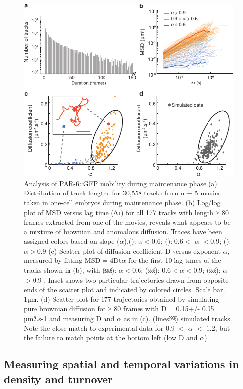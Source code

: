   \begin{figure}[h!]
  	\centering
  	\includegraphics[width=0.8\hsize]{nmeth/Fig3}
  	\caption{\label{fig:fig3}Analysis of PAR-6::GFP mobility during maintenance phase (a) Distribution of track lengths for 30,558 tracks from n = 5 movies taken in one-cell embryos during maintenance phase. (b) Log/log plot of MSD versus lag time (∆τ) for all 177 tracks with length ≥ 80 frames extracted from one of the movies, reveals what appears to be a mixture of brownian and anomalous diffusion. Traces have been assigned colors based on slope ($\alpha$),(): $\alpha$$<$0.6; (): 0.6$<$ $\alpha$ $<$0.9; (): $\alpha$$>$0.9 (c) Scatter plot of diffusion coefficient D versus exponent $\alpha$, measured by fitting MSD = 4Dt$\alpha$ for the first 10 lag times of the tracks shown in (b), with (￼): $\alpha$$<$0.6; (￼): 0.6$<$$\alpha$$<$0.9; (￼): $\alpha$$>$0.9 . Inset shows two particular trajectories drawn from opposite ends of the scatter plot and indicated by colored circles. Scale bar, 1µm. (d) Scatter plot for 177 trajectories obtained by simulating pure brownian diffusion for ≥ 80 frames with D = 0.15+/- 0.05 µm2.s-1 and measuring D and $\alpha$ as in (c). (lines￼) simulated tracks. Note the close match to experimental data for 0.9 $<$ $\alpha$ $<$ 1.2, but the failure to match points at the bottom left (low D and $\alpha$). }
  \end{figure}
 

 
 
 \subsection{Measuring spatial and temporal variations in density and turnover}
 
